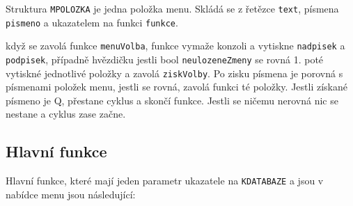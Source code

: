 Struktura \texttt{MPOLOZKA} je jedna položka menu. Skládá se z řetězce \texttt{text}, písmena \texttt{pismeno} a ukazatelem 
na funkci \texttt{funkce}. 

když se zavolá funkce \texttt{menuVolba}, funkce vymaže konzoli a vytiskne \texttt{nadpisek} a \texttt{podpisek}, případně 
hvězdičku jestli bool \texttt{neulozeneZmeny} se rovná 1. poté vytiskné jednotlivé položky a zavolá \texttt{ziskVolby}. 
Po zisku písmena je porovná s písmenami položek menu, jestli se rovná, zavolá funkci té položky. Jestli získané 
písmeno je Q, přestane cyklus a skončí funkce. Jestli se ničemu nerovná nic se nestane a cyklus zase začne. 

\subsection{Hlavní funkce}
Hlavní funkce, které mají jeden parametr ukazatele na \texttt{KDATABAZE} a jsou v nabídce menu jsou následující:

